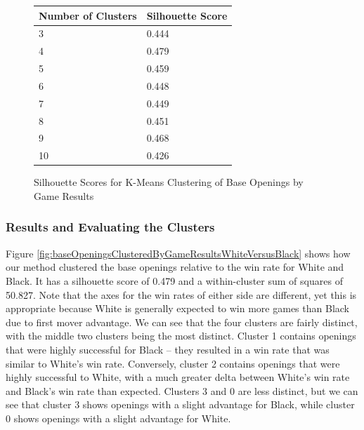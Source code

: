 \documentclass[a4paper, 11pt]{article}
\begin{document}
\begin{figure}[H]
    \centering
    \caption{Silhouette Scores for K-Means Clustering of Base Openings by Game Results}
    \label{fig:silhouetteScoresForBaseOpeningsClusteredByGameResults}
    \begin{tabular}{| l | l |} 
        \hline
        \bf{Number of Clusters} & \bf{Silhouette Score} \\ [0.5ex] 
        \hline
        3 & 0.444 \\
        \hline
        4 & 0.479 \\
        \hline
        5 & 0.459 \\
        \hline
        6 & 0.448 \\
        \hline
        7 & 0.449 \\
        \hline
        8 & 0.451 \\
        \hline
        9 & 0.468 \\
        \hline
        10 & 0.426 \\
        \hline
    \end{tabular}
\end{figure}

\subsubsection{Results and Evaluating the Clusters}
Figure \ref{fig:baseOpeningsClusteredByGameResultsWhiteVersusBlack} shows how our method clustered the base openings relative to the win rate for White and Black. It has a silhouette score of 0.479 and a within-cluster sum of squares of 50.827. Note that the axes for the win rates of either side are different, yet this is appropriate because White is generally expected to win more games than Black due to first mover advantage. We can see that the four clusters are fairly distinct, with the middle two clusters being the most distinct. Cluster 1 contains openings that were highly successful for Black -- they resulted in a win rate that was similar to White's win rate. Conversely, cluster 2 contains openings that were highly successful to White, with a much greater delta between White's win rate and Black's win rate than expected. Clusters 3 and 0 are less distinct, but we can see that cluster 3 shows openings with a slight advantage for Black, while cluster 0 shows openings with a slight advantage for White.
\end{document}
